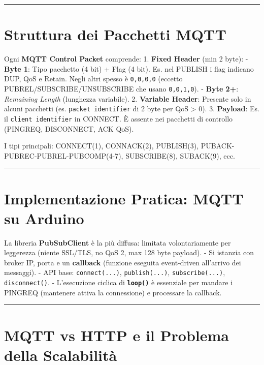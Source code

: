 \documentclass[
  italian,
  openany]{book}
\begin{document}
\begin{center}\rule{0.5\linewidth}{0.5pt}\end{center}

\section{Struttura dei Pacchetti
MQTT}\label{struttura-dei-pacchetti-mqtt}

Ogni \textbf{MQTT Control Packet} comprende: 1. \textbf{Fixed Header}
(min 2 byte): - \textbf{Byte 1}: Tipo pacchetto (4 bit) + Flag (4 bit).
Es. nel PUBLISH i flag indicano DUP, QoS e Retain. Negli altri spesso è
\texttt{0,0,0,0} (eccetto PUBREL/SUBSCRIBE/UNSUBSCRIBE che usano
\texttt{0,0,1,0}). - \textbf{Byte 2+}: \emph{Remaining Length}
(lunghezza variabile). 2. \textbf{Variable Header}: Presente solo in
alcuni pacchetti (es. \texttt{packet\ identifier} di 2 byte per QoS
\textgreater{} 0). 3. \textbf{Payload}: Es. il
\texttt{client\ identifier} in CONNECT. È assente nei pacchetti di
controllo (PINGREQ, DISCONNECT, ACK QoS).

I tipi principali: CONNECT(1), CONNACK(2), PUBLISH(3),
PUBACK-PUBREC-PUBREL-PUBCOMP(4-7), SUBSCRIBE(8), SUBACK(9), ecc.

\begin{center}\rule{0.5\linewidth}{0.5pt}\end{center}

\section{Implementazione Pratica: MQTT su
Arduino}\label{implementazione-pratica-mqtt-su-arduino}

La libreria \textbf{PubSubClient} è la più diffusa: limitata
volontariamente per leggerezza (niente SSL/TLS, no QoS 2, max 128 byte
payload). - Si istanzia con broker IP, porta e un \textbf{callback}
(funzione eseguita event-driven all'arrivo dei messaggi). - API base:
\texttt{connect(...)}, \texttt{publish(...)}, \texttt{subscribe(...)},
\texttt{disconnect()}. - L'esecuzione ciclica di
\textbf{\texttt{loop()}} è essenziale per mandare i PINGREQ (mantenere
attiva la connessione) e processare la callback.

\begin{center}\rule{0.5\linewidth}{0.5pt}\end{center}

\section{MQTT vs HTTP e il Problema della
Scalabilità}\label{mqtt-vs-http-e-il-problema-della-scalabilituxe0}
\end{document}
